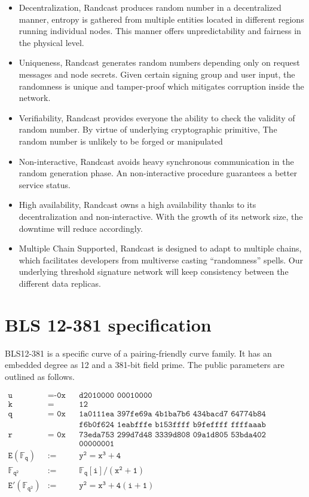\documentclass[11pt]{article}
\begin{document}
\begin{itemize}
    \item Decentralization, Randcast produces random number in a decentralized manner, entropy is gathered from multiple entities located in different regions running individual nodes. This manner offers unpredictability and fairness in the physical level.
    \item Uniqueness, Randcast generates random numbers depending only on request messages and node secrets. Given certain signing group and user input, the randomness is unique and tamper-proof which mitigates corruption inside the network.
    \item Verifiability, Randcast provides everyone the ability to check the validity of random number. By virtue of underlying cryptographic primitive, The random number is unlikely to be forged or manipulated
    \item Non-interactive, Randcast avoids heavy synchronous communication in the random generation phase. An non-interactive procedure guarantees a better service status.
    \item High availability, Randcast owns a high availability thanks to its decentralization and non-interactive. With the growth of its network size, the downtime will reduce accordingly.
    \item Multiple Chain Supported, Randcast is designed to adapt to multiple chains, which facilitates developers from multiverse casting “randomness” spells. Our underlying threshold signature network will keep consistency between the different data replicas.
\end{itemize}

\appendix
\section{BLS 12-381 specification}
BLS12-381 is a specific curve of a pairing-friendly curve family. It has an embedded degree as 12 and a 381-bit field prime. The public parameters are outlined as follows\cite{sean2017bls}.

\begin{align*}
\texttt{u} &= \texttt{-0x} && \texttt{d2010000 00010000} \\
\texttt{k} &= &&\texttt{12} \\
\texttt{q} &= \texttt{ 0x} && \texttt{1a0111ea 397fe69a 4b1ba7b6 434bacd7 64774b84 f38512bf 6730d2a0} \\
& && \texttt{f6b0f624 1eabfffe b153ffff b9feffff ffffaaab} \\
\texttt{r} &= \texttt{ 0x} && \texttt{73eda753 299d7d48 3339d808 09a1d805 53bda402 fffe5bfe ffffffff}\\
& && \texttt{00000001} \\
\mathtt{E(\mathbb{F}_q)} &:= &&\mathtt{y^2 = x^3 + 4} \\
\mathtt{\mathbb{F}_{q^2}} &:= &&\mathtt{\mathbb{F}_q[i]/(x^2 + 1)} \\
\mathtt{E'(\mathbb{F}_{q^2})} &:= &&\mathtt{y^2 = x^3 + 4(i + 1)} \\
\end{align*}


\end{document}
